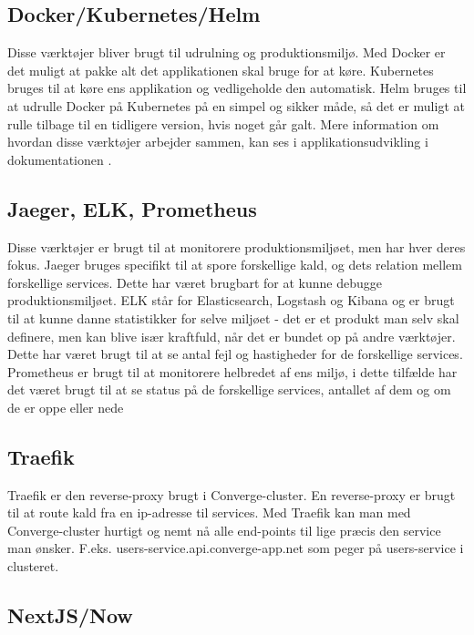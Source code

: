 \subsection{Docker/Kubernetes/Helm}

Disse værktøjer bliver brugt til udrulning og produktionsmiljø. Med Docker er det muligt at pakke alt det applikationen skal bruge for at køre. Kubernetes bruges til at køre ens applikation og vedligeholde den automatisk. Helm bruges til at udrulle Docker på Kubernetes på en simpel og sikker måde, så det er muligt at rulle tilbage til en tidligere version, hvis noget går galt. Mere information om hvordan disse værktøjer arbejder sammen, kan ses i applikationsudvikling i dokumentationen \cite{application-development-dokumentation}.

\subsection{Jaeger, ELK, Prometheus}

Disse værktøjer er brugt til at monitorere produktionsmiljøet, men har hver deres fokus. Jaeger bruges specifikt til at spore forskellige kald, og dets relation mellem forskellige services. Dette har været brugbart for at kunne debugge produktionsmiljøet. ELK \cite[ELK]{converge-terms} står for Elasticsearch, Logstash og Kibana og er brugt til at kunne danne statistikker for selve miljøet - det er et produkt man selv skal definere, men kan blive især kraftfuld, når det er bundet op på andre værktøjer. Dette har været brugt til at se antal fejl og hastigheder for de forskellige services. Prometheus er brugt til at monitorere helbredet af ens miljø, i dette tilfælde har det været brugt til at se status på de forskellige services, antallet af dem og om de er oppe eller nede

\subsection{Traefik}

Traefik er den reverse-proxy brugt i Converge-cluster. En reverse-proxy er brugt til at route kald fra en ip-adresse til services. Med Traefik kan man med Converge-cluster hurtigt og nemt nå alle end-points til lige præcis den service man ønsker. F.eks. users-service.api.converge-app.net som peger på users-service i clusteret.

\subsection{NextJS/Now}

